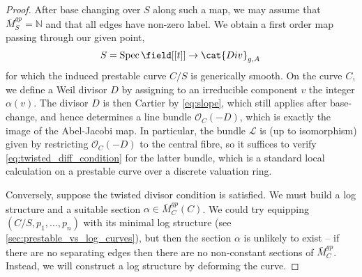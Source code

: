 \documentclass[a4paper,12pt]{article} %
\newcommand{\on}[1]{\operatorname{#1}}
\newcommand{\bb}[1]{{\mathbb{#1}}}
\newcommand{\ca}[1]{{\mathcal{#1}}}
\theoremstyle{definition}
\theoremstyle{plain}%
\begin{document}
\begin{proof}
After base changing over $S$ along such a map, we may assume 
that $\bar M_S^{gp} = \bb N$ and that all edges have non-zero label. 
We  obtain a first order map passing through our given point,
$$S = \on{Spec} {\field}[[t]] \to \cat{Div}_{g,A}\, $$
for which the induced prestable curve $C/S$ is generically smooth. On the curve $C$, we define a Weil divisor $D$ by assigning to an irreducible component $v$ the integer $\alpha(v)$. The divisor $D$ is then Cartier by \eqref{eq:slope}, which still applies after base-change, and hence determines a line bundle $\ca O_C(-D)$, which is exactly the image of the Abel-Jacobi map. In particular, the bundle $\ca L$ is (up to isomorphism) given by restricting $\ca O_C(-D)$ to the central fibre, so it suffices to verify \eqref{eq:twisted_diff_condition} for the latter bundle, which is a standard local calculation on a prestable curve over a discrete valuation ring. 


%


Conversely, suppose the twisted divisor condition is satisfied. We must build a log structure and a suitable section $\alpha \in \bar M_C^{gp}(C)$. We could try equipping $(C/S, p_1, \dots, p_n)$ with its minimal log structure (see \cref{sec:prestable_vs_log_curves}), but then the section $\alpha$ is
unlikely to exist -- if there are no separating edges then there are no non-constant sections of $\bar M_C^{gp}$. Instead, we will construct a log structure by deforming the curve. 


\end{proof}
\end{document}

